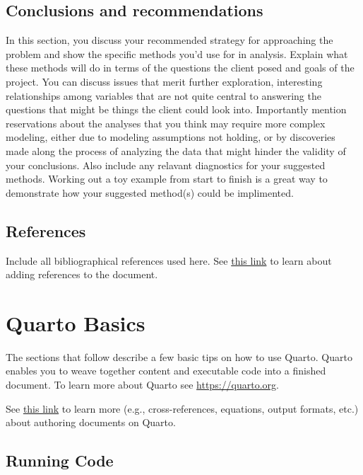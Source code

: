\documentclass[
  letterpaper,
]{report}
\begin{document}
\hypertarget{conclusions-and-recommendations}{%
\section{Conclusions and
recommendations}\label{conclusions-and-recommendations}}

In this section, you discuss your recommended strategy for approaching
the problem and show the specific methods you'd use for in analysis.
Explain what these methods will do in terms of the questions the client
posed and goals of the project. You can discuss issues that merit
further exploration, interesting relationships among variables that are
not quite central to answering the questions that might be things the
client could look into. Importantly mention reservations about the
analyses that you think may require more complex modeling, either due to
modeling assumptions not holding, or by discoveries made along the
process of analyzing the data that might hinder the validity of your
conclusions. Also include any relavant diagnostics for your suggested
methods. Working out a toy example from start to finish is a great way
to demonstrate how your suggested method(s) could be implimented.

\hypertarget{references}{%
\section{References}\label{references}}

Include all bibliographical references used here. See
\href{https://quarto.org/docs/get-started/authoring/rstudio.html\#citations}{this
link} to learn about adding references to the document.

\hypertarget{quarto-basics}{%
\chapter{Quarto Basics}\label{quarto-basics}}

The sections that follow describe a few basic tips on how to use Quarto.
Quarto enables you to weave together content and executable code into a
finished document. To learn more about Quarto see
\url{https://quarto.org}.

See
\href{https://quarto.org/docs/get-started/authoring/rstudio.html}{this
link} to learn more (e.g., cross-references, equations, output formats,
etc.) about authoring documents on Quarto.

\hypertarget{running-code}{%
\section{Running Code}\label{running-code}}
\end{document}
